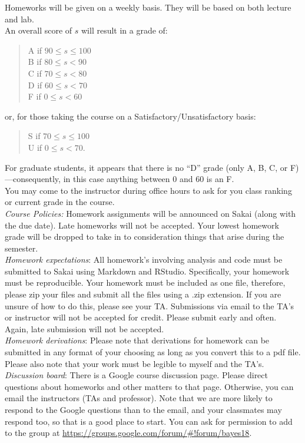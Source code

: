 \documentclass[11pt]{article}
\begin{document}
Homeworks will be given on a weekly basis. They will be based on both lecture and lab. \\

An overall score of $s$ will result in a grade of:
\begin{quote}
A if $90\leq s\leq 100$ \\
B if $80\leq s < 90$ \\
C if $70\leq s < 80$ \\
D if $60\leq s < 70$ \\
F if $0\leq s < 60$
\end{quote}
or, for those taking the course on a Satisfactory/Unsatisfactory basis:
\begin{quote}
S if $70\leq s\leq 100$ \\
U if $0\leq s < 70$.
\end{quote}
For graduate students, it appears that there is no ``D'' grade (only A, B, C, or F)---consequently, in this case anything between $0$ and $60$ is an F. \\

You may come to the instructor during office hours to ask for you class ranking or current grade in the course. \\

\emph{Course Policies:} 
Homework assignments will be announced on Sakai (along with the due date). Late homeworks will not be accepted. Your lowest homework grade will be dropped to take in to consideration things that arise during the semester. \\

\emph{Homework expectations}: All homework's involving analysis and code must be submitted to Sakai using Markdown and RStudio. Specifically, your homework must be reproducible. Your homework must be included as one file, therefore, please zip your files and submit all the files using a .zip extension. If you are unsure of how to do this, please see your TA. Submissions via email to the TA's or instructor will not be accepted for credit. Please submit early and often. Again, late submission will not be accepted. \\

\emph{Homework derivations}: Please note that derivations for homework can be submitted in any format of your choosing as long as you convert this to a pdf file. Please also note that your work must be legible to myself and the TA's. \\


\emph{Discussion board}:
There is a Google course discussion page. Please direct questions about homeworks and other matters to that page. Otherwise, you can email the instructors (TAs and professor). Note that we are more likely to respond to the Google questions than to the email, and your classmates may respond too, so that is a good place to start. You can ask for permission to add to the group at \url{https://groups.google.com/forum/#!forum/bayes18}.\\
\end{document}
